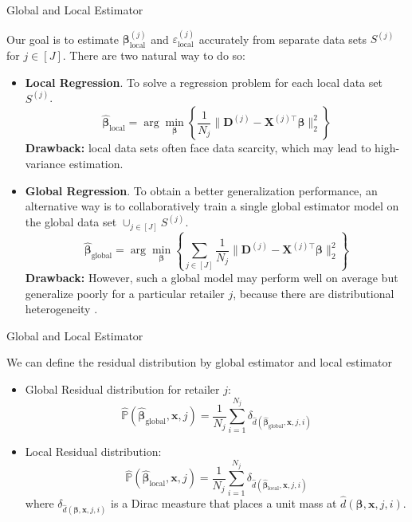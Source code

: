 \documentclass{beamer}
\newcommand{\mb}[1]{{\mathbf{#1}}}
\newcommand{\txrd}[1]{{\textcolor{sintefred}{\textbf{#1}}}}
\newcommand{\bbp}{\mathbb{P}}
\begin{document}
\begin{frame}{Global and Local Estimator}

Our goal is to estimate $ {\bm \beta}^{(j)}_{\text{local}}$ and $\varepsilon_{\text{local}}^{(j)}$ accurately from separate data sets $S^{(j)}$ for $j \in [J]$. There are two natural way to do so:

\begin{itemize}
    \item \txrd{Local Regression}. To solve a regression problem for each local data set $S^{(j)}$. 
    {\large
    \[
        \hat{\bm \beta}_{\text{local}} = \arg \min_{\bm \beta} \left\{\frac{1}{N_j} \|\mb D^{(j)}  - \mb X^{(j) \top} {\bm \beta}  \|_2^2 \right\}
    \]}
    \txrd{Drawback:} local data sets often face data scarcity, which may lead to high-variance estimation. 
    \item \txrd{Global Regression}. To obtain a better generalization performance, an alternative way is to collaboratively train a single global estimator model on the global data set $\cup_{j \in [J]} S^{(j)}$. 
    {\large
    \[
    \hat{\bm \beta}_{\text{global}} = \arg \min_{\bm \beta} \left\{ \sum_{j \in [J]} \frac{1}{N_j} \|\mb D^{(j)}  - \mb X^{(j) \top} {\bm \beta}  \|_2^2 \right\}
    \]}
    \txrd{Drawback:} However, such a global model may perform well on average but generalize poorly for a particular retailer $j$, because there are distributional heterogeneity \citep{guo2025statistical, mo2024minimax}.
\end{itemize}
\end{frame}


\begin{frame}{Global and Local Estimator}

We can define the residual distribution by global estimator and local estimator

\begin{itemize}
    \item Global Residual distribution for retailer $j$:
    \[
    \hat{\bbp}(\bm \hat{\bm \beta}_{\text{global}} ,\bm x, j) = \frac{1}{N_j} \sum_{i=1}^{N_j} \delta_{\hat{d}(\hat{\bm \beta}_{\text{global}} , {\bm x}, j, i)}
    \]
    \item Local Residual distribution:
    \[
    \hat{\bbp}(\bm \hat{\bm \beta}_{\text{local}} ,\bm x, j) = \frac{1}{N_j} \sum_{i=1}^{N_j} \delta_{\hat{d}(\hat{\bm \beta}_{\text{local}} , {\bm x}, j, i)}
    \]
    where $\delta_{\hat{d}({\bm \beta}, {\bm x}, j, i)}$ is a Dirac measture that places a unit mass at ${\hat{d}({\bm \beta}, {\bm x}, j, i)}$.
\end{itemize}
\end{frame}
\end{document}
